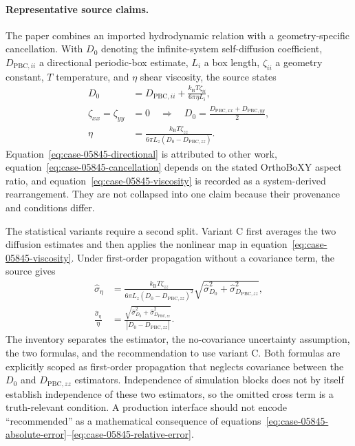 \paragraph{Representative source claims.}
The paper combines an imported hydrodynamic relation with a geometry-specific cancellation. With $D_0$ denoting the infinite-system self-diffusion coefficient, $D_{\mathrm{PBC},ii}$ a directional periodic-box estimate, $L_i$ a box length, $\zeta_{ii}$ a geometry constant, $T$ temperature, and $\eta$ shear viscosity, the source states
\begin{align}
D_0
  &= D_{\mathrm{PBC},ii}
   + \frac{k_{\mathrm B}T\zeta_{ii}}{6\pi\eta L_i},
   \label{eq:case-05845-directional}\\
\zeta_{xx}=\zeta_{yy}
  &=0
  \quad\Longrightarrow\quad
D_0
  =\frac{D_{\mathrm{PBC},xx}+D_{\mathrm{PBC},yy}}{2},
   \label{eq:case-05845-cancellation}\\
\eta
  &=\frac{k_{\mathrm B}T\zeta_{zz}}
  {6\pi L_z\left(D_0-D_{\mathrm{PBC},zz}\right)}.
   \label{eq:case-05845-viscosity}
\end{align}
Equation~\ref{eq:case-05845-directional} is attributed to other work, equation~\ref{eq:case-05845-cancellation} depends on the stated OrthoBoXY aspect ratio, and equation~\ref{eq:case-05845-viscosity} is recorded as a system-derived rearrangement. They are not collapsed into one claim because their provenance and conditions differ.

The statistical variants require a second split. Variant C first averages the two diffusion estimates and then applies the nonlinear map in equation~\ref{eq:case-05845-viscosity}. Under first-order propagation without a covariance term, the source gives
\begin{align}
\widehat{\sigma}_{\eta}
  &=\frac{k_{\mathrm B}T\zeta_{zz}}
  {6\pi L_z\left(D_0-D_{\mathrm{PBC},zz}\right)^2}
  \sqrt{\widehat{\sigma}_{D_0}^2+
  \widehat{\sigma}_{D_{\mathrm{PBC},zz}}^2},
  \label{eq:case-05845-absolute-error}\\
\frac{\widehat{\sigma}_{\eta}}{\eta}
  &=\frac{\sqrt{\widehat{\sigma}_{D_0}^2+
  \widehat{\sigma}_{D_{\mathrm{PBC},zz}}^2}}
  {\left|D_0-D_{\mathrm{PBC},zz}\right|}.
  \label{eq:case-05845-relative-error}
\end{align}
The inventory separates the estimator, the no-covariance uncertainty assumption, the two formulas, and the recommendation to use variant C. Both formulas are explicitly scoped as first-order propagation that neglects covariance between the $D_0$ and $D_{\mathrm{PBC},zz}$ estimators. Independence of simulation blocks does not by itself establish independence of these two estimators, so the omitted cross term is a truth-relevant condition. A production interface should not encode ``recommended'' as a mathematical consequence of equations~\ref{eq:case-05845-absolute-error}--\ref{eq:case-05845-relative-error}.

